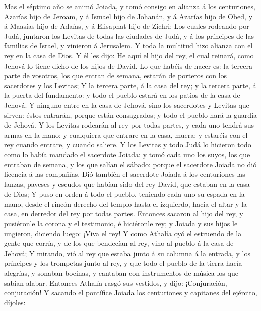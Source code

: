  Mas el séptimo año se animó Joiada, y tomó consigo en
alianza á los centuriones, Azarías hijo de Jeroam, y á Ismael hijo de
Johanán, y á Azarías hijo de Obed, y á Maasías hijo de Adaías, y á
Elisaphat hijo de Zichri;  Los cuales rodeando por Judá,
juntaron los Levitas de todas las ciudades de Judá, y á los príncipes de
las familias de Israel, y vinieron á Jerusalem.  Y toda la
multitud hizo alianza con el rey en la casa de Dios. Y él les dijo: He
aquí el hijo del rey, el cual reinará, como Jehová lo tiene dicho de los
hijos de David.  Lo que habéis de hacer es: la tercera parte
de vosotros, los que entran de semana, estarán de porteros con los
sacerdotes y los Levitas;  Y la tercera parte, á la casa del
rey; y la tercera parte, á la puerta del fundamento: y todo el pueblo
estará en los patios de la casa de Jehová.  Y ninguno entre
en la casa de Jehová, sino los sacerdotes y Levitas que sirven: éstos
entrarán, porque están consagrados; y todo el pueblo hará la guardia de
Jehová.  Y los Levitas rodearán al rey por todas partes, y
cada uno tendrá sus armas en la mano; y cualquiera que entrare en la
casa, muera: y estaréis con el rey cuando entrare, y cuando saliere.
 Y los Levitas y todo Judá lo hicieron todo como lo había
mandado el sacerdote Joiada: y tomó cada uno los suyos, los que entraban
de semana, y los que salían el sábado: porque el sacerdote Joiada no dió
licencia á las compañías.  Dió también el sacerdote Joiada á
los centuriones las lanzas, paveses y escudos que habían sido del rey
David, que estaban en la casa de Dios;  Y puso en orden á
todo el pueblo, teniendo cada uno su espada en la mano, desde el rincón
derecho del templo hasta el izquierdo, hacia el altar y la casa, en
derredor del rey por todas partes.  Entonces sacaron al
hijo del rey, y pusiéronle la corona y el testimonio, é hiciéronle rey;
y Joiada y sus hijos le ungieron, diciendo luego: ¡Viva el rey!
 Y como Athalía oyó el estruendo de la gente que corría, y
de los que bendecían al rey, vino al pueblo á la casa de Jehová;
 Y mirando, vió al rey que estaba junto á su columna á la
entrada, y los príncipes y los trompetas junto al rey, y que todo el
pueblo de la tierra hacía alegrías, y sonaban bocinas, y cantaban con
instrumentos de música los que sabían alabar. Entonces Athalía rasgó sus
vestidos, y dijo: ¡Conjuración, conjuración!  Y sacando el
pontífice Joiada los centuriones y capitanes del ejército, díjoles:
